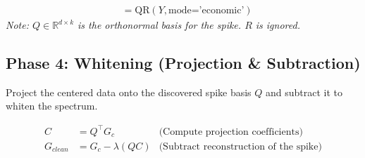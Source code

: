 \begin{align}
    [Q, R] &= \text{QR}(Y, \text{mode='economic'})
\end{align}
\textit{Note: $Q \in \mathbb{R}^{d \times k}$ is the orthonormal basis for the spike. $R$ is ignored.}

\subsection*{Phase 4: Whitening (Projection \& Subtraction)}
Project the centered data onto the discovered spike basis $Q$ and subtract it to whiten the spectrum.

\begin{align}
    C &= Q^\top G_c & \text{(Compute projection coefficients)} \\
    G_{clean} &= G_c - \lambda (Q C) & \text{(Subtract reconstruction of the spike)}
\end{align}